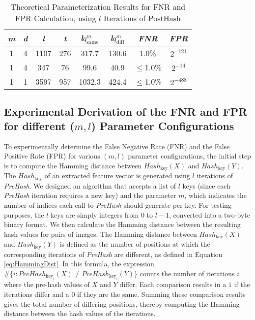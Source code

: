 \begin{table}[htbp] 
    \centering
    \begin{tabular}{|c|c|c|c|c|c|c|c|}
        \hline
        \textit{m} & \textit{d} & \textit{l} & \textit{t} & \textit{l}\(q_{\text{same}}^m\) & \textit{l}\(q_{\text{diff}}^m\) & \textit{FNR} & \textit{FPR} \\
        \hline
        1 & 4 & 1107 & 276 & 317.7 & 130.6 & 1.0\% & \(2^{-121}\) \\
        1 & 4 & 347 & 76 & 99.6 & 40.9 & \(\leq\)1.0\% & \(2^{-14}\)\\
        1 & 1 & 3597 & 957 & 1032.3 & 424.4 & \(\leq\)1.0\% & \(2^{-488}\)\\
        \hline
    \end{tabular}
    \caption{Theoretical Parameterization Results for FNR and FPR Calculation, using $l$ Iterations of PostHash}
    \label{tab:theoretical_parameterization_PostHash}
\end{table}

\subsection{Experimental Derivation of the FNR and FPR for different (\(m, l\)) Parameter Configurations}

To experimentally determine the False Negative Rate (FNR) and the False Positive Rate (FPR) for various \((m, l)\) parameter configurations, the initial step is to compute the Hamming distance between \( Hash_{\text{key}}(X) \) and \( Hash_{\text{key}}(Y) \). The \( Hash_{\text{key}} \) of an extracted feature vector is generated using \( l \) iterations of \textit{PreHash}. We designed an algorithm that accepts a list of \( l \) keys (since each \textit{PreHash} iteration requires a new key) and the parameter \( m \), which indicates the number of indices each call to \textit{PreHash} should generate per key. For testing purposes, the \( l \) keys are simply integers from 0 to \( l-1 \), converted into a two-byte binary format. We then calculate the Hamming distance between the resulting hash values for pairs of images. The Hamming distance between \( Hash_{\text{key}}(X) \) and \( Hash_{\text{key}}(Y) \) is defined as the number of positions at which the corresponding iterations of \textit{PreHash} are different, as defined in Equation \ref{eq:HammingDist}. In this formula, the expression \( \# \{ i : PreHash_{\text{key}_i}(X) \neq PreHash_{\text{key}_i}(Y) \} \) counts the number of iterations \( i \) where the pre-hash values of \( X \) and \( Y \) differ. Each comparison results in a \(1\) if the iterations differ and a \(0\) if they are the same. Summing these comparison results gives the total number of differing positions, thereby computing the Hamming distance between the hash values of the iterations.


